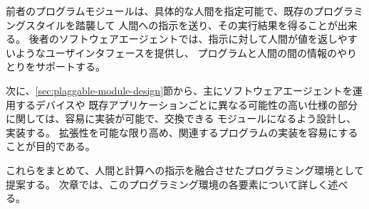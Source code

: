 前者のプログラムモジュールは、具体的な人間を指定可能で、既存のプログラミングスタイルを踏襲して
人間への指示を送り、その実行結果を得ることが出来る。
後者のソフトウェアエージェントでは、指示に対して人間が値を返しやすいようなユーザインタフェースを提供し、
プログラムと人間の間の情報のやりとりをサポートする。

次に、\ref{sec:plaggable-module-design}節から、主にソフトウェアエージェントを運用するデバイスや
既存アプリケーションごとに異なる可能性の高い仕様の部分に関しては、容易に実装が可能で、交換できる
モジュールになるよう設計し、実装する。
拡張性を可能な限り高め、関連するプログラムの実装を容易にすることが目的である。

これらをまとめて、人間と計算への指示を融合させたプログラミング環境として提案する。
次章では、このプログラミング環境の各要素について詳しく述べる。
